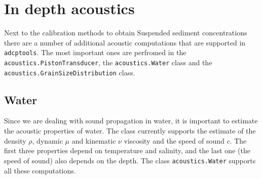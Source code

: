 \documentclass[]{article}
\begin{document}
%
%
%
\section{In depth acoustics}
Next to the calibration methods to obtain Suspended sediment concentrations there are a number of additional acoustic computations that are supported in \lstinline!adcptools!. The most important ones are perfromed in the \lstinline!acoustics.PistonTransducer!, the \lstinline!acoustics.Water! class and the \lstinline!acoustics.GrainSizeDistribution! class.
\subsection{Water}
Since we are dealing with sound propagation in water, it is important to estimate the acoustic properties of water. The class currently supports the estimate of the density $\rho$, dynamic $\mu$ and kinematic $\nu$ viscosity and the speed of sound $c$. The first three properties depend on temperature and salinity, and the last one (the speed of sound) also depends on the depth. The class \lstinline!acoustics.Water! supports all these computations. 
\end{document}
